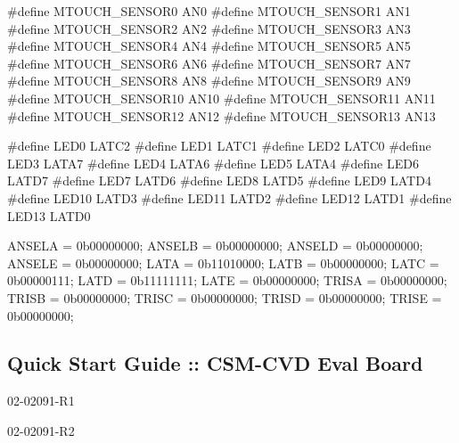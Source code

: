 \begin{DoxyCode}
\textcolor{preprocessor}{#define MTOUCH\_SENSOR0              AN0         }
\textcolor{preprocessor}{#define MTOUCH\_SENSOR1              AN1         }
\textcolor{preprocessor}{#define MTOUCH\_SENSOR2              AN2    }
\textcolor{preprocessor}{#define MTOUCH\_SENSOR3              AN3   }
\textcolor{preprocessor}{#define MTOUCH\_SENSOR4              AN4}
\textcolor{preprocessor}{#define MTOUCH\_SENSOR5              AN5}
\textcolor{preprocessor}{#define MTOUCH\_SENSOR6              AN6}
\textcolor{preprocessor}{#define MTOUCH\_SENSOR7              AN7}
\textcolor{preprocessor}{#define MTOUCH\_SENSOR8              AN8 }
\textcolor{preprocessor}{#define MTOUCH\_SENSOR9              AN9}
\textcolor{preprocessor}{#define MTOUCH\_SENSOR10             AN10    }
\textcolor{preprocessor}{#define MTOUCH\_SENSOR11             AN11    }
\textcolor{preprocessor}{#define MTOUCH\_SENSOR12             AN12    }
\textcolor{preprocessor}{#define MTOUCH\_SENSOR13             AN13  }

\textcolor{preprocessor}{#define LED0  LATC2}
\textcolor{preprocessor}{#define LED1  LATC1}
\textcolor{preprocessor}{#define LED2  LATC0}
\textcolor{preprocessor}{#define LED3  LATA7}
\textcolor{preprocessor}{#define LED4  LATA6}
\textcolor{preprocessor}{#define LED5  LATA4}
\textcolor{preprocessor}{#define LED6  LATD7}
\textcolor{preprocessor}{#define LED7  LATD6}
\textcolor{preprocessor}{#define LED8  LATD5}
\textcolor{preprocessor}{#define LED9  LATD4}
\textcolor{preprocessor}{#define LED10 LATD3}
\textcolor{preprocessor}{#define LED11 LATD2}
\textcolor{preprocessor}{#define LED12 LATD1}
\textcolor{preprocessor}{#define LED13 LATD0}

ANSELA  = 0b00000000;
ANSELB  = 0b00000000;
ANSELD  = 0b00000000;
ANSELE  = 0b00000000;
LATA    = 0b11010000;
LATB    = 0b00000000;
LATC    = 0b00000111;
LATD    = 0b11111111;
LATE    = 0b00000000;
TRISA   = 0b00000000;
TRISB   = 0b00000000;
TRISC   = 0b00000000;
TRISD   = 0b00000000;
TRISE   = 0b00000000;
\end{DoxyCode}
 \hypertarget{GSE_R2}{}\subsection{Quick Start Guide \+:\+: C\+S\+M-\/\+C\+V\+D Eval Board}\label{GSE_R2}
\begin{DoxyItemize}
\item 02-\/02091-\/\+R1 \item 02-\/02091-\/\+R2\end{DoxyItemize}

